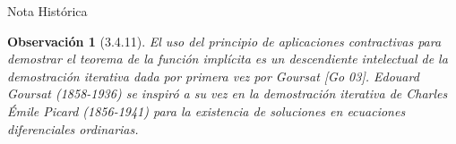 \documentclass[10pt]{beamer}
\newtheorem*{observacion}{Observación}
\begin{document}
	\begin{frame}{Nota Histórica}
		\begin{observacion}[3.4.11]
			El uso del principio de aplicaciones contractivas para demostrar el teorema de la función implícita es un descendiente intelectual de la demostración iterativa dada por primera vez por Goursat [Go 03]. Edouard Goursat (1858-1936) se inspiró a su vez en la demostración iterativa de Charles Émile Picard (1856-1941) para la existencia de soluciones en ecuaciones diferenciales ordinarias.
		\end{observacion}
	\end{frame}
	
\end{document}
